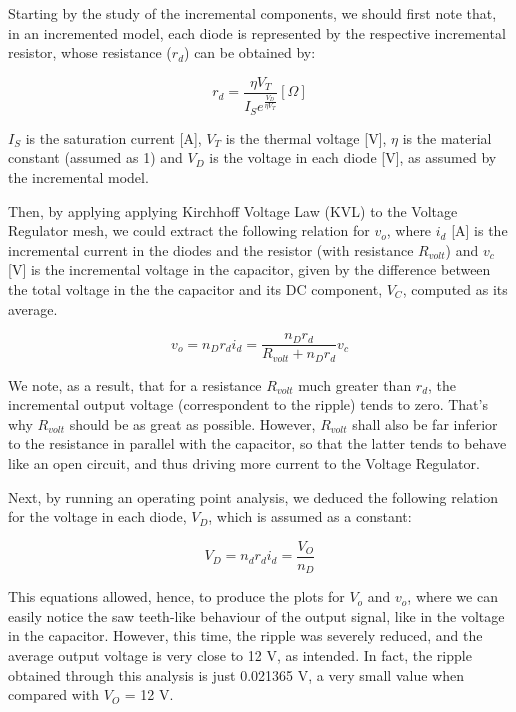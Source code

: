 Starting by the study of the incremental components, we should first note that, in an incremented model, each diode is represented by the respective incremental resistor, whose resistance ($r_d$) can be obtained by:

\begin{equation}
	r_d = \frac{\eta V_T}{I_S e^{\frac{V_D}{\eta V_T}}} [\Omega]
	\label{eq:rIncremental}
\end{equation}

$I_S$ is the saturation current [A], $V_T$ is the thermal voltage [V], $\eta$ is the material constant (assumed as 1) and $V_D$ is the voltage in each diode [V], as assumed by the incremental model.

Then, by applying applying Kirchhoff Voltage Law (KVL) to the Voltage Regulator mesh, we could extract the following relation for $v_o$, where $i_d$ [A] is the incremental current in the diodes and the resistor (with resistance $R_{volt}$) and $v_c$ [V] is the incremental voltage in the capacitor, given by the difference between the total voltage in the the capacitor and its DC component, $V_C$, computed as its average.

\begin{equation}
	v_o = n_D r_d i_d = \frac{n_D r_d}{R_{volt} + n_D r_d} v_c
	\label{eq:vO_Inc}
\end{equation}

We note, as a result, that for a resistance $R_{volt}$ much greater than $r_d$, the incremental output voltage (correspondent to the ripple) tends to zero. That's why $R_{volt}$ should be as great as possible. However, $R_{volt}$ shall also be far inferior to the resistance in parallel with the capacitor, so that the latter tends to behave like an open circuit, and thus driving more current to the Voltage Regulator. 

Next, by running an operating point analysis, we deduced the following relation for the voltage in each diode, $V_D$, which is assumed as a constant:

\begin{equation}
	V_D = n_d r_d i_d = \frac{V_O}{n_D}
	\label{eq:vD_Inc}
\end{equation}

This equations allowed, hence, to produce the plots for $V_o$ and $v_o$, where we can easily notice the saw teeth-like behaviour of the output signal, like in the voltage in the capacitor. However, this time, the ripple was severely reduced, and the average output voltage is very close to 12 V, as intended. In fact, the ripple obtained through this analysis is just 0.021365 V, a very small value when compared with $V_O$ = 12 V.

